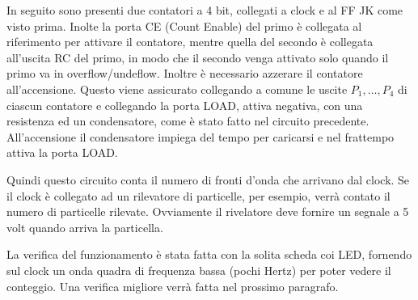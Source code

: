 In seguito sono presenti due contatori a 4 bit, collegati a clock e al FF JK come visto prima. Inolte
la porta CE (Count Enable) del primo è collegata al riferimento per attivare il contatore, mentre quella del
secondo è collegata all'uscita RC del primo, in modo che il secondo venga attivato solo quando il primo
va in overflow/undeflow. Inoltre è necessario azzerare il contatore all'accensione. Questo viene assicurato
collegando a comune le uscite $P_1,\dots,P_4$ di ciascun contatore e collegando la porta LOAD, attiva negativa,
con una resistenza ed un condensatore, come è stato fatto nel circuito precedente. All'accensione il condensatore
impiega del tempo per caricarsi e nel frattempo attiva la porta LOAD.

Quindi questo circuito conta il numero di fronti d'onda che arrivano dal clock. Se il clock è collegato
ad un rilevatore di particelle, per esempio, verrà contato il numero di particelle rilevate. Ovviamente
il rivelatore deve fornire un segnale a 5 volt quando arriva la particella.

La verifica del funzionamento è stata fatta con la solita scheda coi LED, fornendo sul clock
un onda quadra di frequenza bassa (pochi Hertz) per poter vedere il conteggio. Una verifica
migliore verrà fatta nel prossimo paragrafo.

